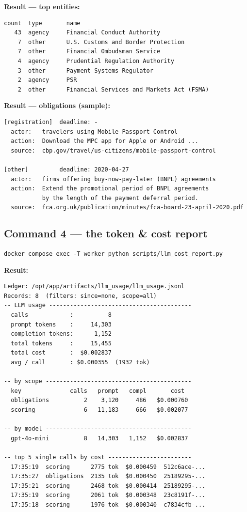 \documentclass[11pt,a4paper]{article}
\begin{document}
\textbf{Result --- top entities:}
\begin{lstlisting}[style=output]
count  type       name
   43  agency     Financial Conduct Authority
    7  other      U.S. Customs and Border Protection
    7  other      Financial Ombudsman Service
    4  agency     Prudential Regulation Authority
    3  other      Payment Systems Regulator
    2  agency     PSR
    2  other      Financial Services and Markets Act (FSMA)
\end{lstlisting}

\textbf{Result --- obligations (sample):}
\begin{lstlisting}[style=output]
[registration]  deadline: -
  actor:   travelers using Mobile Passport Control
  action:  Download the MPC app for Apple or Android ...
  source:  cbp.gov/travel/us-citizens/mobile-passport-control

[other]         deadline: 2020-04-27
  actor:   firms offering buy-now-pay-later (BNPL) agreements
  action:  Extend the promotional period of BNPL agreements
           by the length of the payment deferral period.
  source:  fca.org.uk/publication/minutes/fca-board-23-april-2020.pdf
\end{lstlisting}

\subsection{Command 4 --- the token \& cost report}

\begin{lstlisting}[style=shell]
docker compose exec -T worker python scripts/llm_cost_report.py
\end{lstlisting}

\textbf{Result:}
\begin{lstlisting}[style=output]
Ledger: /opt/app/artifacts/llm_usage/llm_usage.jsonl
Records: 8  (filters: since=none, scope=all)
-- LLM usage -----------------------------------------
  calls            :          8
  prompt tokens    :     14,303
  completion tokens:      1,152
  total tokens     :     15,455
  total cost       :  $0.002837
  avg / call       : $0.000355  (1932 tok)

-- by scope ------------------------------------------
  key              calls   prompt   compl       cost
  obligations          2    3,120     486   $0.000760
  scoring              6   11,183     666   $0.002077

-- by model ------------------------------------------
  gpt-4o-mini          8   14,303   1,152   $0.002837

-- top 5 single calls by cost ------------------------
  17:35:19  scoring      2775 tok  $0.000459  512c6ace-...
  17:35:27  obligations  2135 tok  $0.000450  25189295-...
  17:35:21  scoring      2468 tok  $0.000414  25189295-...
  17:35:19  scoring      2061 tok  $0.000348  23c8191f-...
  17:35:18  scoring      1976 tok  $0.000340  c7834cfb-...
\end{lstlisting}
\end{document}
